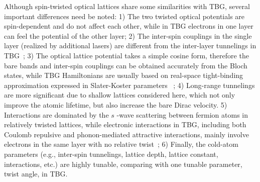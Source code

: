 \documentclass[twocolumn,english,prl,floatfix,citeautoscript,nofootinbib]{revtex4}
\begin{document}
Although spin-twisted optical lattices share some similarities with TBG,
several important differences need be noted: 1) The two twisted optical
potentials are spin-dependent and do not affect each other, while in TBG
electrons in one layer can feel the potential of the other layer; 2) The
inter-spin couplings in the single layer (realized by additional lasers) are
different from the inter-layer tunnelings in TBG~\cite%
{PhysRevLett.99.256802,SM}; 3) The optical lattice potential takes a simple
cosine form, therefore the bare bands and inter-spin couplings can be
obtained accurately from the Bloch states, while TBG Hamiltonians are
usually based on real-space tight-binding approximation expressed in
Slater-Koster parameters~\cite%
{PhysRevLett.99.256802,PhysRev.94.1498,JPSJ.70.1647,PhysRevB.85.195458,PhysRevB.93.235153}%
; 4) Long-range tunnelings are more significant due to shallow lattices
considered here, which not only improve the atomic lifetime, but also
increase the bare Dirac velocity. 5) Interactions are dominated by the $s$%
-wave scattering between fermion atoms in relatively twisted lattices, while
electronic interactions in TBG, including both Coulomb repulsive
and phonon-mediated attractive interactions, mainly involve electrons in the
same layer with no relative twist~\cite%
{PhysRevB.98.220504,PhysRevLett.122.257002,PhysRevLett.121.257001,
PhysRevX.8.041041,PhysRevLett.121.217001,PhysRevLett.122.026801}; 6)
Finally, the cold-atom parameters (e.g., inter-spin tunnelings, lattice
depth, lattice constant, interactions, etc.) are highly tunable, comparing
with one tunable parameter, twist angle, in TBG.
\end{document}
